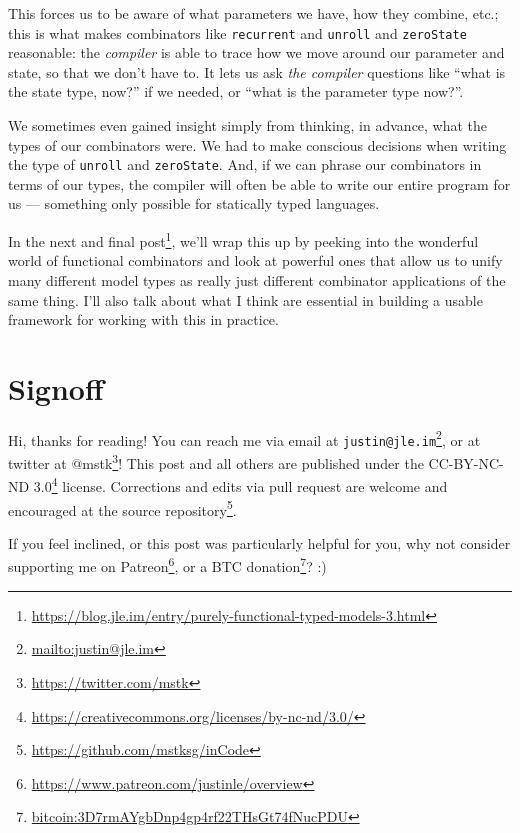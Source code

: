 \documentclass[]{article}
\renewcommand{\href}[2]{#2\footnote{\url{#1}}}
\begin{document}
\begin{enumerate}
  This forces us to be aware of what parameters we have, how they combine, etc.;
  this is what makes combinators like \texttt{recurrent} and \texttt{unroll} and
  \texttt{zeroState} reasonable: the \emph{compiler} is able to trace how we
  move around our parameter and state, so that we don't have to. It lets us ask
  \emph{the compiler} questions like ``what is the state type, now?'' if we
  needed, or ``what is the parameter type now?''.

  We sometimes even gained insight simply from thinking, in advance, what the
  types of our combinators were. We had to make conscious decisions when writing
  the type of \texttt{unroll} and \texttt{zeroState}. And, if we can phrase our
  combinators in terms of our types, the compiler will often be able to write
  our entire program for us --- something only possible for statically typed
  languages.
\end{enumerate}

In the
\href{https://blog.jle.im/entry/purely-functional-typed-models-3.html}{next and
final post}, we'll wrap this up by peeking into the wonderful world of
functional combinators and look at powerful ones that allow us to unify many
different model types as really just different combinator applications of the
same thing. I'll also talk about what I think are essential in building a usable
framework for working with this in practice.

\hypertarget{signoff}{%
\section{Signoff}\label{signoff}}

Hi, thanks for reading! You can reach me via email at
\href{mailto:justin@jle.im}{\nolinkurl{justin@jle.im}}, or at twitter at
\href{https://twitter.com/mstk}{@mstk}! This post and all others are published
under the \href{https://creativecommons.org/licenses/by-nc-nd/3.0/}{CC-BY-NC-ND
3.0} license. Corrections and edits via pull request are welcome and encouraged
at \href{https://github.com/mstksg/inCode}{the source repository}.

If you feel inclined, or this post was particularly helpful for you, why not
consider \href{https://www.patreon.com/justinle/overview}{supporting me on
Patreon}, or a \href{bitcoin:3D7rmAYgbDnp4gp4rf22THsGt74fNucPDU}{BTC donation}?
:)
\end{document}

